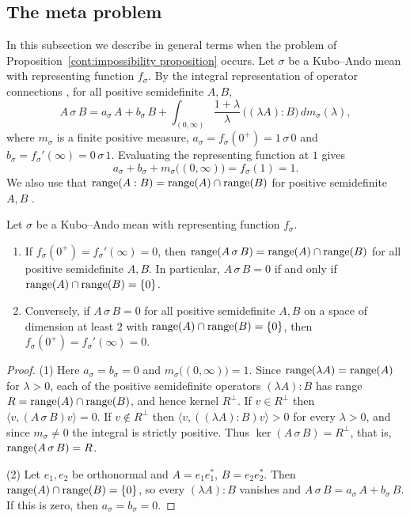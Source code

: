     \subsection{The meta problem}
In this subsection we describe in general terms when the problem of Proposition~\ref{cont:impossibility proposition} occurs. Let $\sigma$ be a Kubo--Ando mean with representing function $f_\sigma$. By the integral representation of operator connections \cite[Theorem~5.11]{hiaipetz2014intro}, for all positive semidefinite $A,B$,
\[
A\,\sigma\,B=a_\sigma\,A+b_\sigma\,B+\int_{(0,\infty)}\frac{1+\lambda}{\lambda}\,\big((\lambda A):B\big)\,dm_\sigma(\lambda),
\]
where $m_\sigma$ is a finite positive measure, $a_\sigma=f_\sigma(0^+)=1\,\sigma\,0$ and $b_\sigma=f_\sigma'(\infty)=0\,\sigma\,1$. Evaluating the representing function at $1$ gives
\[
a_\sigma+b_\sigma+m_\sigma\big((0,\infty)\big)=f_\sigma(1)=1.
\]
We also use that $\operatorname{range}(A:B)=\operatorname{range}(A)\cap\operatorname{range}(B)$ for positive semidefinite $A,B$ \cite{AndersonDuffin1969}.
 
\begin{theorem}\label{cont:range theorem}
Let $\sigma$ be a Kubo--Ando mean with representing function $f_\sigma$.
\begin{enumerate}
\item If $f_\sigma(0^+)=f_\sigma'(\infty)=0$, then $\operatorname{range}(A\,\sigma\,B)=\operatorname{range}(A)\cap\operatorname{range}(B)$ for all positive semidefinite $A,B$. In particular, $A\,\sigma\,B=0$ if and only if $\operatorname{range}(A)\cap\operatorname{range}(B)=\{0\}$.
\item Conversely, if $A\,\sigma\,B=0$ for all positive semidefinite $A,B$ on a space of dimension at least $2$ with $\operatorname{range}(A)\cap\operatorname{range}(B)=\{0\}$, then $f_\sigma(0^+)=f_\sigma'(\infty)=0$.
\end{enumerate}
\end{theorem}
\begin{proof}
(1) Here $a_\sigma=b_\sigma=0$ and $m_\sigma\big((0,\infty)\big)=1$. Since $\operatorname{range}(\lambda A)=\operatorname{range}(A)$ for $\lambda>0$, each of the positive semidefinite operators $(\lambda A):B$ has range $R=\operatorname{range}(A)\cap\operatorname{range}(B)$, and hence kernel $R^\perp$. If $v\in R^\perp$ then $\langle v,(A\,\sigma\,B)v\rangle=0$. If $v\notin R^\perp$ then $\langle v,((\lambda A):B)v\rangle>0$ for every $\lambda>0$, and since $m_\sigma\neq0$ the integral is strictly positive. Thus $\ker(A\,\sigma\,B)=R^\perp$, that is, $\operatorname{range}(A\,\sigma\,B)=R$.
 
(2) Let $e_1,e_2$ be orthonormal and $A=e_1e_1^*$, $B=e_2e_2^*$. Then $\operatorname{range}(A)\cap\operatorname{range}(B)=\{0\}$, so every $(\lambda A):B$ vanishes and $A\,\sigma\,B=a_\sigma\,A+b_\sigma\,B$. If this is zero, then $a_\sigma=b_\sigma=0$.
\end{proof}
 

